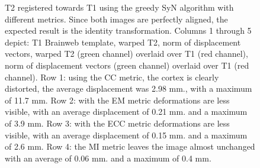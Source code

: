 \begin{figure}[H]
\centering
{}
\caption{T2 registered towards T1 using the greedy SyN algorithm with different metrics. Since both images are perfectly aligned, the expected result is the identity transformation.
Columns 1 through 5 depict: T1 Brainweb template, warped T2, norm of displacement vectors, warped T2 (green channel) overlaid over T1 (red channel), norm of displacement vectors
(green channel) overlaid over T1 (red channel). Row 1: using the CC metric, the cortex is clearly distorted, the average displacement was 2.98 mm., with a maximum of 11.7 mm.
Row 2: with the EM metric deformations are less visible, with an average displacement of 0.21 mm. and a maximum of 3.9 mm.
Row 3: with the ECC metric deformations are less visible, with an average displacement of 0.15 mm. and a maximum of 2.6 mm. Row 4: the MI metric leaves the image almost unchanged
with an average of 0.06 mm. and a maximum of 0.4 mm.}
\label{fig:t1_t2_reg_pannel}
\end{figure}

